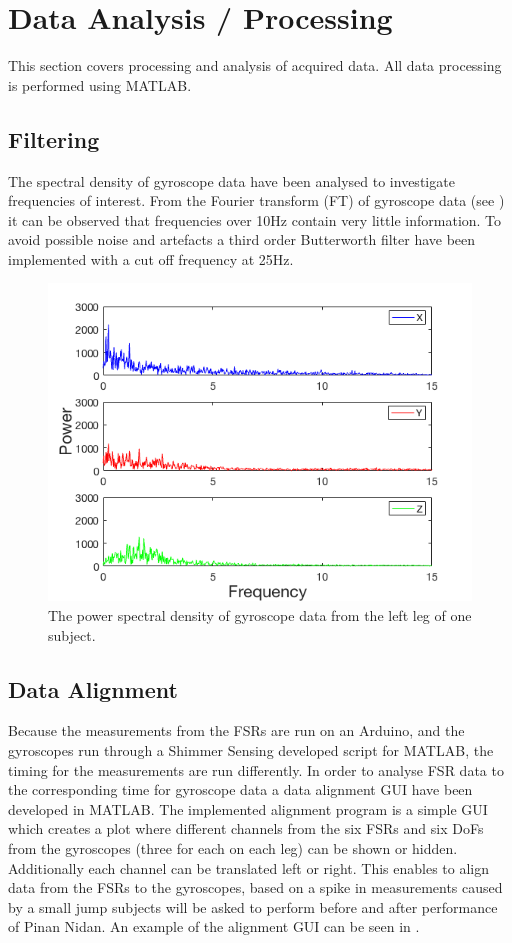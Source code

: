\section{Data Analysis / Processing}
This section covers processing and analysis of acquired data. All data processing is performed using MATLAB. 

\subsection{Filtering}
The spectral density of gyroscope data have been analysed to investigate frequencies of interest. From the Fourier transform (FT) of gyroscope data (see ) it can be observed that frequencies over 10Hz contain very little information. To avoid possible noise and artefacts a third order Butterworth filter have been implemented with a cut off frequency at 25Hz. %

\begin{figure}[H]
	\includegraphics[width=.6\textwidth]{figures/gyroFFTPlot}
	\caption{The power spectral density of gyroscope data from the left leg of one subject.}
	\label{fig:gyroFFTPlot}  %
\end{figure}



\subsection{Data Alignment}
Because the measurements from the FSRs are run on an Arduino, and the gyroscopes run through a Shimmer Sensing developed script for MATLAB, the timing for the measurements are run differently. In order to analyse FSR data to the corresponding time for gyroscope data a data alignment GUI have been developed in MATLAB. The implemented alignment program is a simple GUI which creates a plot where different channels from the six FSRs and six DoFs from the gyroscopes (three for each on each leg) can be shown or hidden. Additionally each channel can be translated left or right. This enables to align data from the FSRs to the gyroscopes, based on a spike in measurements caused by a small jump subjects will be asked to perform before and after performance of Pinan Nidan. An example of the alignment GUI can be seen in .


